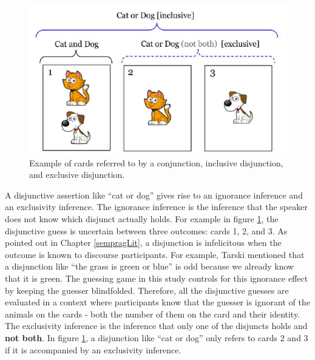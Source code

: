 \documentclass[man]{apa6}
\theoremstyle{definition}
\theoremstyle{definition}
\theoremstyle{definition}
\theoremstyle{remark}
\begin{document}
\begin{figure}[t]

{\centering \includegraphics{figs/exclusivity-1} 

}

\caption{Example of cards referred to by a conjunction, inclusive disjunction, and exclusive disjunction.}\label{fig:exclusivity}
\end{figure}

A disjunctive assertion like \enquote{cat or dog} gives rise to an
ignorance inference and an exclusivity inference. The ignorance
inference is the inference that the speaker does not know which disjunct
actually holds. For example in figure \ref{fig:exclusivity}, the
disjunctive guess is uncertain between three outcomes: cards 1, 2, and
3. As pointed out in Chapter \ref{sempragLit}, a disjunction is
infelicitous when the outcome is known to discourse participants. For
example, Tarski mentioned that a disjunction like \enquote{the grass is
green or blue} is odd because we already know that it is green. The
guessing game in this study controls for this ignorance effect by
keeping the guesser blindfolded. Therefore, all the disjunctive guesses
are evaluated in a context where participants know that the guesser is
ignorant of the animals on the cards - both the number of them on the
card and their identity. The exclusivity inference is the inference that
only one of the disjuncts holds and \textbf{not both}. In figure
\ref{fig:exclusivity}, a disjunction like \enquote{cat or dog} only
refers to cards 2 and 3 if it is accompanied by an exclusivity
inference.
\end{document}
